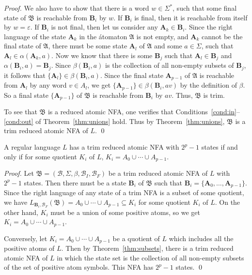 \documentclass{llncs}
\newcommand{\eps}{\varepsilon}
\newcommand{\Sig}{\Sigma}
\newcommand{\bA}{{\mathbf A}}
\newcommand{\bmB}{\bm{B}}
\newcommand{\cB}{{\mathcal B}}
\newcommand{\fA}{{\mathfrak A}}
\newcommand{\fB}{{\mathfrak B}}
\begin{document}
\begin{proof}
We also have to show that there is a word $w\in\Sig^*$, such that some 
final state of $\fB$ is reachable from $\bmB_i$ by $w$.
If $\bmB_i$ is final, then it is reachable from itself by $w=\eps$.
If $\bmB_i$ is not final, then let us consider any $\bA_k\in\bmB_i$. 
Since the right language of the state $\bA_k$ in the \'atomaton $\fA$ 
is not empty, and $\bA_k$ cannot be the final state of $\fA$, there must be 
some state $\bA_l$ of $\fA$ and some $a\in\Sig$, such that 
$\bA_l\in\alpha(\bA_k,a)$.
Now we know that there is some $\bmB_j$ such that $\bA_l\in\bmB_j$ and
$\alpha(\bmB_i,a)=\bmB_j$. Since $\beta(\bmB_i,a)$ is the collection
of all non-empty subsets of $\bmB_j$, it follows that 
$\{\bA_l\}\in\beta(\bmB_i,a)$.
Since the final state $\bA_{p-1}$ of $\fA$ is reachable from $\bA_l$ by 
any word $v\in A_l$, we get 
$\{\bA_{p-1}\}\in\beta(\bmB_i,av)$ by the definition of $\beta$. 
So a final state $\{\bA_{p-1}\}$ of $\fB$ is reachable from $\bmB_i$ by $av$.   
Thus, $\fB$ is trim.

To see that $\fB$ is a reduced atomic NFA, one verifies that 
Conditions~\ref{cond:in}--\ref{cond:out} of Theorem~\ref{thm:unions} hold.
Thus by Theorem~\ref{thm:unions}, $\fB$ is a trim reduced atomic NFA of $L$.
\qed
\end{proof} 


\begin{theorem}
\label{thm:maximal}
A regular language $L$ has a trim reduced atomic NFA with $2^p-1$ states if and 
only if for some quotient $K_i$ of $L$, $K_i= A_0 \cup \cdots \cup A_{p-1}$.
\end{theorem}

\begin{proof}
Let $\fB=(\cB,\Sig,\beta,\cB_I,\cB_F)$ be a trim reduced atomic NFA of $L$ 
with $2^p-1$ states. Then there must be a state $\bmB_i$ of $\fB$ such that
$\bmB_i=\{\bA_0,\ldots,\bA_{p-1}\}$. Since the right language of any state 
of a trim NFA is a subset of some quotient, we have
$L_{\bmB_i,\cB_F}(\fB)=A_0\cup\cdots\cup A_{p-1}\subseteq K_i$ for some
quotient $K_i$ of $L$.
On the other hand, $K_i$ must be a union of some positive atoms, 
so we get $K_i= A_0 \cup \cdots \cup A_{p-1}$.

Conversely, let $K_i= A_0 \cup \cdots \cup A_{p-1}$ be a quotient of $L$
which includes all the positive atoms of $L$. Then 
by Theorem~\ref{thm:subsets}, there is a trim reduced atomic NFA of $L$
in which the state set is the collection of all non-empty subsets of the set 
of positive atom symbols. This NFA has $2^p-1$ states. 
\qed
\end{proof} 
\end{document}
